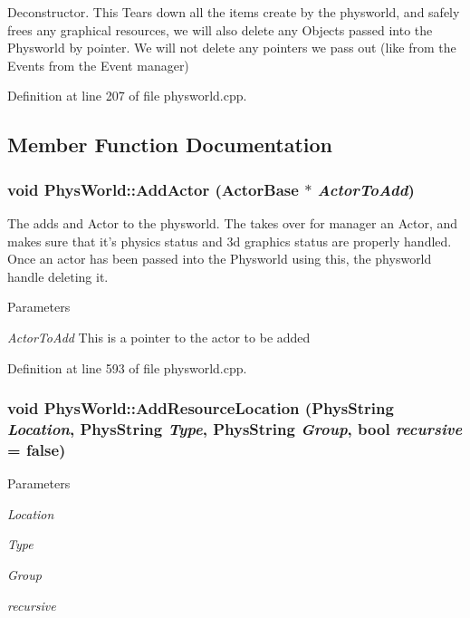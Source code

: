 Deconstructor. This Tears down all the items create by the physworld, and safely frees any graphical resources, we will also delete any Objects passed into the Physworld by pointer. We will not delete any pointers we pass out (like from the Events from the Event manager) 

Definition at line 207 of file physworld.cpp.

\subsection{Member Function Documentation}
\hypertarget{classPhysWorld_ae490054b3e1c4c5aa69cb8e3b7bd2f29}{
\subsubsection[{AddActor}]{\setlength{\rightskip}{0pt plus 5cm}void PhysWorld::AddActor ({\bf ActorBase} $\ast$ {\em ActorToAdd})}}
\label{db/df5/classPhysWorld_ae490054b3e1c4c5aa69cb8e3b7bd2f29}


The adds and Actor to the physworld. The takes over for manager an Actor, and makes sure that it's physics status and 3d graphics status are properly handled. Once an actor has been passed into the Physworld using this, the physworld handle deleting it. 
\begin{DoxyParams}{Parameters}
\item[{\em ActorToAdd}]This is a pointer to the actor to be added \end{DoxyParams}


Definition at line 593 of file physworld.cpp.\hypertarget{classPhysWorld_a757783fa596bda8ebdbc24234c6b621a}{
\subsubsection[{AddResourceLocation}]{\setlength{\rightskip}{0pt plus 5cm}void PhysWorld::AddResourceLocation (PhysString {\em Location}, \/  PhysString {\em Type}, \/  PhysString {\em Group}, \/  bool {\em recursive} = {\ttfamily false})}}
\label{db/df5/classPhysWorld_a757783fa596bda8ebdbc24234c6b621a}

\begin{DoxyParams}{Parameters}
\item[{\em Location}]\item[{\em Type}]\item[{\em Group}]\item[{\em recursive}]\end{DoxyParams}


